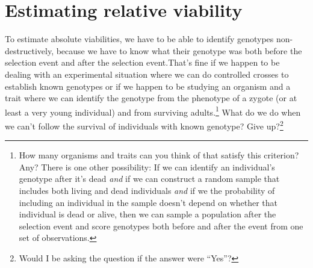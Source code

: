 \documentclass[12pt]{article}
\begin{document}
\section*{Estimating relative viability}

To estimate absolute viabilities, we have to be able to identify
genotypes non-destructively, because we have to know what their
genotype was both before the selection event and after the selection
event.That's fine if we happen to be dealing with an experimental
situation where we can do controlled crosses to establish known
genotypes or if we happen to be studying an organism and a trait where
we can identify the genotype from the phenotype of a zygote (or at
least a very young individual) and from surviving adults.\footnote{How
  many organisms and traits can you think of that satisfy this
  criterion? Any? There is one other possibility: If we can identify
  an individual's genotype after it's dead {\it and\/} if we can
  construct a random sample that includes both living and dead
  individuals {\it and\/} if we the probability of including an
  individual in the sample doesn't depend on whether that individual
  is dead or alive, then we can sample a population after the
  selection event and score genotypes both before and after the event
  from one set of observations.} What do we do when we can't follow
the survival of individuals with known genotype? Give
up?\footnote{Would I be asking the question if the answer were
  ``Yes''?}
\end{document}
